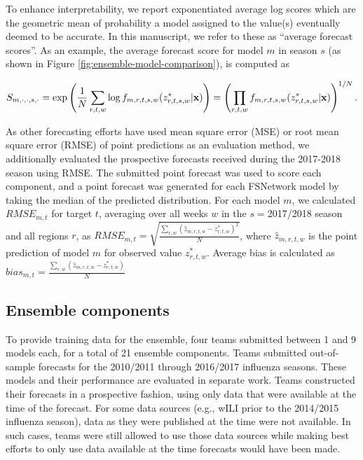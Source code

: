 \documentclass{article}\usepackage[]{graphicx}\usepackage[]{color}
\begin{document}
To enhance interpretability, we report exponentiated average log scores which are the geometric mean of probability a model assigned to the value(s) eventually deemed to be accurate. In this manuscript, we refer to these as ``average forecast scores''. As an example, the average forecast score for model $m$ in season $s$ (as shown in Figure \ref{fig:ensemble-model-comparison}), is computed as 

\begin{equation}
S_{m,\cdot,\cdot,s,\cdot} = \exp \left ( \frac{1}{N} \sum_{r,t,w} \log f_{m,r,t,s,w}(z^*_{r,t,s,w}|{\bf x}) \right ) 
  =  \left ( \prod_{r,t,w}  f_{m,r,t,s,w}(z^*_{r,t,s,w}|{\bf x}) \right ) ^{1/N}. 
\end{equation}

As other forecasting efforts have used mean square error (MSE) or root mean square error (RMSE) of point predictions as an evaluation method, we additionally evaluated the prospective forecasts received during the 2017-2018 season using RMSE. The submitted point forecast was used to score each component, and a point forecast was generated for each FSNetwork model by taking the median of the predicted distribution. For each model $m$, we calculated $RMSE_{m,t}$ for target $t$, averaging over all weeks $w$ in the $s=$2017/2018 season and all regions $r$, as $RMSE_{m,t} = \sqrt{\frac{\sum_{r,w}(\hat z_{m,r,t,w} - z^*_{r,t,w})^2}{N}}$, where $\hat z_{m,r,t,w}$ is the point prediction of model $m$ for observed value $z^*_{r,t,w}$. Average bias is calculated as $bias_{m,t} = \frac{\sum_{r,w}(\hat z_{m,r,t,w} - z^*_{r,t,w})}{N}$

\subsection{Ensemble components}
To provide training data for the ensemble, four teams submitted between 1 and 9 models each, for a total of 21 ensemble components. Teams submitted out-of-sample forecasts for the 2010/2011 through 2016/2017 influenza seasons. These models and their performance are evaluated in separate work.\cite{reich2019collaborative} Teams constructed their forecasts in a prospective fashion, using only data that were available at the time of the forecast. For some data sources (e.g., wILI prior to the 2014/2015 influenza season), data as they were published at the time were not available. In such cases, teams were still allowed to use those data sources while making best efforts to only use data available at the time forecasts would have been made.
\end{document}
